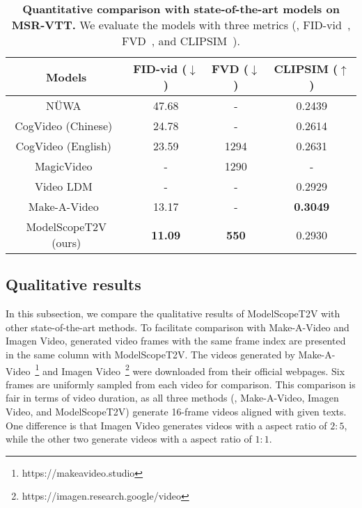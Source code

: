 \begin{table}[t]
\centering
\begin{tabular}{c|ccc}
\hline
\textbf{Models}              & FID-vid ($\downarrow$)   &  FVD ($\downarrow$) & CLIPSIM ($\uparrow$) \\ \hline
N\"UWA~\cite{wu2022nuwa}       & 47.68   & -  & 0.2439        \\
CogVideo (Chinese)~\cite{hong2022cogvideo}   & 24.78 & - & 0.2614      \\
CogVideo (English)~\cite{hong2022cogvideo}   & 23.59  & 1294 & 0.2631  \\
MagicVideo~\cite{zhou2022magicvideo}          & -    & 1290 & -        \\
Video LDM~\cite{blattmann2023align}      & -   &  - & 0.2929 \\ 
Make-A-Video~\cite{singer2022make-a-video}        & 13.17 &  -& \textbf{0.3049}     \\ \hline
ModelScopeT2V (ours) &   \textbf{11.09} & \textbf{550} & 0.2930    \\ \hline
\end{tabular}
\caption{
\textbf{Quantitative comparison with state-of-the-art models on MSR-VTT.} We evaluate the models with three metrics (\ie, FID-vid~\cite{heusel2017gans_nash_equilibrium}, FVD~\cite{unterthiner2018FVD}, and CLIPSIM~\cite{wu2021godiva}).
}
\label{tab:results}
\end{table}


\subsection{Qualitative results} 
In this subsection, we compare the qualitative results of ModelScopeT2V with other state-of-the-art methods. 
To facilitate comparison with Make-A-Video and Imagen Video, generated video frames with the same frame index are presented in the same column with ModelScopeT2V.
The videos generated by Make-A-Video~\cite{singer2022make-a-video}\footnote{https://makeavideo.studio} and Imagen Video~\cite{ho2022imagenvideo}\footnote{https://imagen.research.google/video} were downloaded from their official webpages.
Six frames are uniformly sampled from each video for comparison. 
This comparison is fair in terms of video duration, as all three methods (\ie, Make-A-Video, Imagen Video, and ModelScopeT2V) generate 16-frame videos aligned with given texts.
One difference is that Imagen Video generates videos with a aspect ratio of $2:5$, while the other two generate videos with a aspect ratio of $1:1$.



